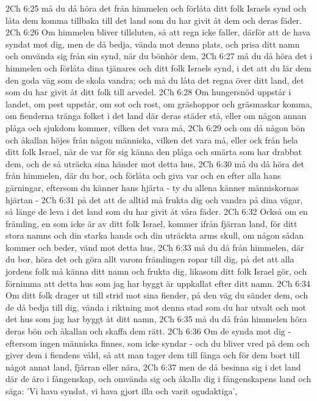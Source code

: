 2Ch 6:25  må du då höra det från himmelen och förlåta ditt folk Israels synd och låta dem komma tillbaka till det land som du har givit åt dem och deras fäder.
2Ch 6:26  Om himmelen bliver tillsluten, så att regn icke faller, därför att de hava syndat mot dig, men de då bedja, vända mot denna plats, och prisa ditt namn och omvända sig från sin synd, när du bönhör dem,
2Ch 6:27  må du då höra det i himmelen och förlåta dina tjänares och ditt folk Israels synd, i det att du lär dem den goda väg som de skola vandra; och må du låta det regna över ditt land, det som du har givit åt ditt folk till arvedel.
2Ch 6:28  Om hungersnöd uppstår i landet, om pest uppstår, om sot och rost, om gräshoppor och gräsmaskar komma, om fienderna tränga folket i det land där deras städer stå, eller om någon annan plåga och sjukdom kommer, vilken det vara må,
2Ch 6:29  och om då någon bön och åkallan höjes från någon människa, vilken det vara må, eller ock från hela ditt folk Israel, när de var för sig känna den plåga och smärta som har drabbat dem, och de så uträcka sina händer mot detta hus,
2Ch 6:30  må du då höra det från himmelen, där du bor, och förlåta och giva var och en efter alla hans gärningar, eftersom du känner hans hjärta - ty du allena känner människornas hjärtan -
2Ch 6:31  på det att de alltid må frukta dig och vandra på dina vägar, så länge de leva i det land som du har givit åt våra fäder.
2Ch 6:32  Också om en främling, en som icke är av ditt folk Israel, kommer ifrån fjärran land, för ditt stora namns och din starka hands och din uträckta arms skull, om någon sådan kommer och beder, vänd mot detta hus,
2Ch 6:33  må du då från himmelen, där du bor, höra det och göra allt varom främlingen ropar till dig, på det att alla jordens folk må känna ditt namn och frukta dig, likasom ditt folk Israel gör, och förnimma att detta hus som jag har byggt är uppkallat efter ditt namn.
2Ch 6:34  Om ditt folk drager ut till strid mot sina fiender, på den väg du sänder dem, och de då bedja till dig, vända i riktning mot denna stad som du har utvalt och mot det hus som jag har byggt åt ditt namn,
2Ch 6:35  må du då från himmelen höra deras bön och åkallan och skaffa dem rätt.
2Ch 6:36  Om de synda mot dig - eftersom ingen människa finnes, som icke syndar - och du bliver vred på dem och giver dem i fiendens våld, så att man tager dem till fånga och för dem bort till något annat land, fjärran eller nära,
2Ch 6:37  men de då besinna sig i det land där de äro i fångenskap, och omvända sig och åkalla dig i fångenskapens land och säga: 'Vi hava syndat, vi hava gjort illa och varit ogudaktiga',
